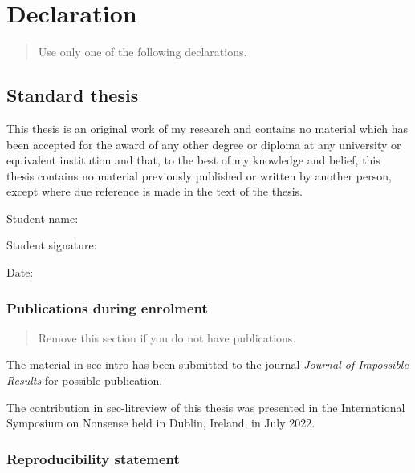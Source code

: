 \documentclass{monashthesis}
\begin{document}

\hypertarget{declaration}{%
\chapter*{Declaration}\label{declaration}}


\begin{quote}
Use only one of the following declarations.
\end{quote}

\hypertarget{standard-thesis}{%
\section*{Standard thesis}\label{standard-thesis}}


This thesis is an original work of my research and contains no material
which has been accepted for the award of any other degree or diploma at
any university or equivalent institution and that, to the best of my
knowledge and belief, this thesis contains no material previously
published or written by another person, except where due reference is
made in the text of the thesis.

Student name:

Student signature:

Date:

\hypertarget{publications-during-enrolment}{%
\subsection*{Publications during
enrolment}\label{publications-during-enrolment}}

\begin{quote}
Remove this section if you do not have publications.
\end{quote}

The material in sec-intro has been submitted to the journal
\emph{Journal of Impossible Results} for possible publication.

The contribution in sec-litreview of this thesis was presented in the
International Symposium on Nonsense held in Dublin, Ireland, in July
2022.

\hypertarget{reproducibility-statement}{%
\subsection*{Reproducibility
statement}\label{reproducibility-statement}}
\end{document}
